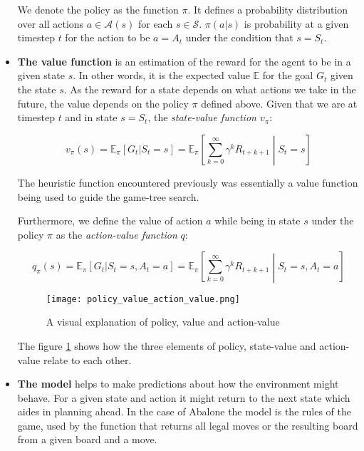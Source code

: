 \begin{itemize}
          We denote the policy as the function $\pi $. It defines a probability distribution over all actions $ a \in \mathcal{A}(s)$ for each $ s \in \mathcal{S} $. $ \pi(a|s)$ is probability at a given timestep $t$ for the action to be $ a = A_t $ under the condition that $ s = S_t $.

    \item \textbf{The value function} is an estimation of the reward for the agent to be in a given state $ s $. In other words, it is the expected value $\mathbb{E}$  for the goal $G_t$ given the state $s$. As the reward for a state depends on what actions we take in the future, the value depends on the policy $ \pi $ defined above. Given that we are at timestep $ t $ and in state $ s = S_t $, the \textit{state-value function $v_{\pi}$}:

          \begin{equation}
              v_{\pi}(s) = \mathbb{E}_{\pi}[G_t | S_t = s] = \mathbb{E}_{\pi}\left[\sum_{k=0}^{\infty} \gamma^kR_{t+k+1} \middle| S_t = s \right]
          \end{equation}

          The heuristic function encountered previously was essentially a value function being used to guide the game-tree search.

          Furthermore, we define the value of action $a$ while being in state $s$ under the policy $\pi$ as the \textit{action-value function} $q$:

          \begin{equation}
              q_{\pi}(s) = \mathbb{E}_{\pi}[G_t | S_t = s, A_t = a] = \mathbb{E}_{\pi}\left[\sum_{k=0}^{\infty} \gamma^kR_{t+k+1} \middle| S_t = s, A_t = a \right]
          \end{equation}

          \begin{figure}
              \centering
              \texttt{[image: policy\_value\_action\_value.png]}
              \caption{A visual explanation of policy, value and action-value \cite[p. 62]{sutton_reinforcement_2018}}
              \label{policy_value_action_value}
          \end{figure}

          The figure \ref{policy_value_action_value} shows how the three elements of policy, state-value and action-value relate to each other.

    \item \textbf{The model} helps to make predictions about how the environment might behave. For a given state and action it might return to the next state which aides in planning ahead. In the case of Abalone the model is the rules of the game, used by the function that returns all legal moves or the resulting board from a given board and a move.
\end{itemize}

